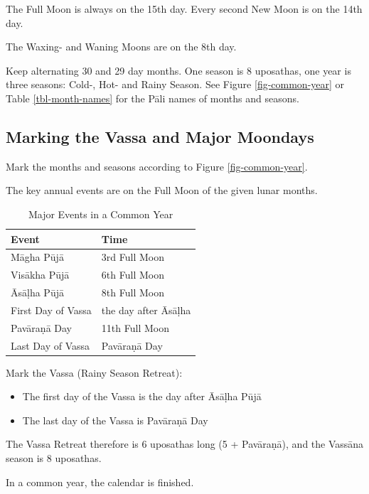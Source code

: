 \documentclass[11pt,oneside]{memoir-article}
\begin{document}
The Full Moon is always on the 15th day. Every second New Moon is on the 14th day.

The \GaWaxingmoon{} Waxing- and \GaWaningmoon{} Waning Moons are on the 8th day.

Keep alternating 30 and 29 day months. One season is 8 uposathas, one year is
three seasons: Cold-, Hot- and Rainy Season. See Figure \ref{fig-common-year} or
Table \ref{tbl-month-names} for the Pāli names of months and seasons.

\subsection{Marking the Vassa and Major Moondays}
\label{sec-1-2-2}
\label{marking-the-moondays-common-year}

Mark the months and seasons according to Figure \ref{fig-common-year}.

The key annual events are on the Full Moon of the given lunar months.

\begin{table}[h]
\caption{\label{tbl-major-events} Major Events in a Common Year}
\centering
\begin{tabular}{ll}
Event & Time\\
\hline
Māgha Pūjā & 3rd Full Moon\\
Visākha Pūjā & 6th Full Moon\\
Āsāḷha Pūjā & 8th Full Moon\\
First Day of Vassa & the day after Āsāḷha\\
Pavāraṇā Day & 11th Full Moon\\
Last Day of Vassa & Pavāraṇā Day\\
\end{tabular}
\end{table}

Mark the Vassa (Rainy Season Retreat):

\begin{itemize}
\item The first day of the Vassa is the day after Āsāḷha Pūjā
\item The last day of the Vassa is Pavāraṇā Day
\end{itemize}

\enlargethispage{2\baselineskip}

The Vassa Retreat therefore is 6 uposathas long (5 + Pavāraṇā), and the Vassāna
season is 8 uposathas.

In a common year, the calendar is finished. 
\end{document}
